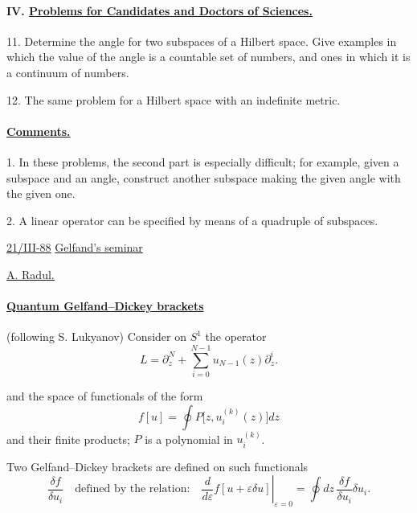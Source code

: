 \paragraph*{IV. \underline{Problems for Candidates and Doctors of Sciences.}}
11. Determine the angle for two subspaces of a Hilbert space.
Give examples in which the value of the angle is a countable
set of numbers, and ones in which it is a continuum of numbers.

12. The same problem for a Hilbert space with an indefinite metric.

\paragraph*{\underline{Comments.}}
1. In these problems, the second part is especially difficult; for example,
given a subspace and an angle, construct
another subspace making the given angle with the given one.

2. A linear operator can be specified by means of
a quadruple of subspaces.

\underline{21/III-88} \qquad \underline{Gelfand's seminar}

\underline{\underline{A. Radul.}}

\paragraph*{\underline{Quantum Gelfand--Dickey brackets}}
(following S. Lukyanov) \qquad Consider on $S^1$ the operator
\begin{equation*}
L=\partial_z^N+\sum_{i=0}^{N-1}u_{N-1}(z)\partial_z^i . \tag{1}
\end{equation*}

and the space of functionals of the form
\begin{equation*}
f[u]=\oint P\bigl[z,u_i^{(k)}(z)\bigr]dz \tag{2}
\end{equation*}
and their finite products; $P$ is a polynomial in $u_i^{(k)}$.

Two Gelfand--Dickey brackets are defined on such functionals
\begin{equation*}
\frac{\delta f}{\delta u_i}\quad
\text{defined by the relation:}\quad
\left.\frac{d}{d\varepsilon}f[u+\varepsilon\delta u]\right|_{\varepsilon=0}
=\oint dz\,\frac{\delta f}{\delta u_i}\delta u_i . \tag{3}
\end{equation*}

